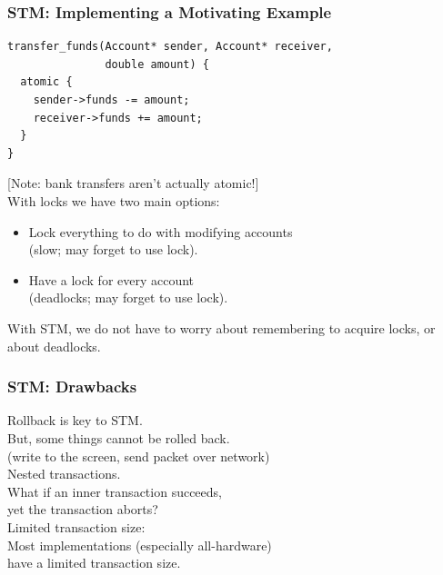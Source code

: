 \begin{frame}[fragile]
  \frametitle{STM: Implementing a Motivating Example}


  \begin{lstlisting}
transfer_funds(Account* sender, Account* receiver,
               double amount) {
  atomic {
    sender->funds -= amount;
    receiver->funds += amount;
  }
}
  \end{lstlisting}
  [Note: bank transfers aren't actually atomic!]\\[1em]

    With locks we have two main options:
      \begin{itemize}
        \item Lock everything to do with modifying accounts \\ 
\qquad (slow; may forget to use lock).
        \item Have a lock for every account \\ 
\qquad (deadlocks; may forget to use lock).
      \end{itemize}
    With STM, we do not have to worry about remembering to acquire locks,
      or about deadlocks.

\end{frame}

\begin{frame}
  \frametitle{STM: Drawbacks}


    Rollback is key to STM. \\
     \qquad But, some things cannot be rolled back. \\
     \qquad (write to the screen, send packet over network)\\[1em]

    Nested transactions. \\
     \qquad What if an inner transaction succeeds, \\ yet the
      transaction aborts? \\[1em]

    Limited transaction size: \\
 \qquad Most implementations (especially
    all-hardware) \\ have a limited transaction size.

\end{frame}

